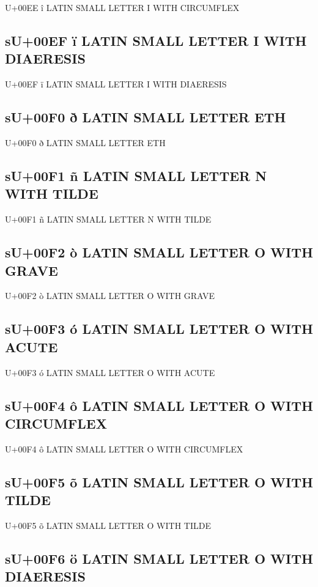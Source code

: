 U+00EE î  LATIN SMALL LETTER I WITH CIRCUMFLEX

\subsection{sU+00EF ï  LATIN SMALL LETTER I WITH DIAERESIS}

U+00EF ï  LATIN SMALL LETTER I WITH DIAERESIS

\subsection{sU+00F0 ð  LATIN SMALL LETTER ETH}

U+00F0 ð  LATIN SMALL LETTER ETH

\subsection{sU+00F1 ñ  LATIN SMALL LETTER N WITH TILDE}

U+00F1 ñ  LATIN SMALL LETTER N WITH TILDE

\subsection{sU+00F2 ò  LATIN SMALL LETTER O WITH GRAVE}

U+00F2 ò  LATIN SMALL LETTER O WITH GRAVE

\subsection{sU+00F3 ó  LATIN SMALL LETTER O WITH ACUTE}

U+00F3 ó  LATIN SMALL LETTER O WITH ACUTE

\subsection{sU+00F4 ô  LATIN SMALL LETTER O WITH CIRCUMFLEX}

U+00F4 ô  LATIN SMALL LETTER O WITH CIRCUMFLEX

\subsection{sU+00F5 õ  LATIN SMALL LETTER O WITH TILDE}

U+00F5 õ  LATIN SMALL LETTER O WITH TILDE

\subsection{sU+00F6 ö  LATIN SMALL LETTER O WITH DIAERESIS}

